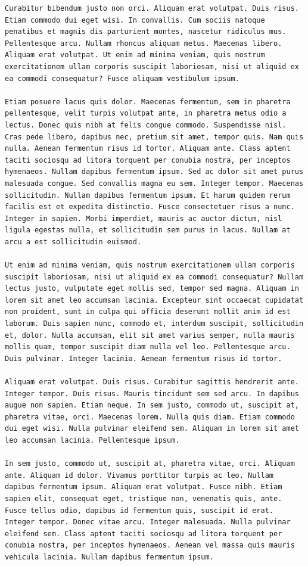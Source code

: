 \documentclass[a4paper, 12pt]{article}
\begin{document}
\begin{verbatim}
Curabitur bibendum justo non orci. Aliquam erat volutpat. Duis risus. Etiam commodo dui eget wisi. In convallis. Cum sociis natoque penatibus et magnis dis parturient montes, nascetur ridiculus mus. Pellentesque arcu. Nullam rhoncus aliquam metus. Maecenas libero. Aliquam erat volutpat. Ut enim ad minima veniam, quis nostrum exercitationem ullam corporis suscipit laboriosam, nisi ut aliquid ex ea commodi consequatur? Fusce aliquam vestibulum ipsum.

Etiam posuere lacus quis dolor. Maecenas fermentum, sem in pharetra pellentesque, velit turpis volutpat ante, in pharetra metus odio a lectus. Donec quis nibh at felis congue commodo. Suspendisse nisl. Cras pede libero, dapibus nec, pretium sit amet, tempor quis. Nam quis nulla. Aenean fermentum risus id tortor. Aliquam ante. Class aptent taciti sociosqu ad litora torquent per conubia nostra, per inceptos hymenaeos. Nullam dapibus fermentum ipsum. Sed ac dolor sit amet purus malesuada congue. Sed convallis magna eu sem. Integer tempor. Maecenas sollicitudin. Nullam dapibus fermentum ipsum. Et harum quidem rerum facilis est et expedita distinctio. Fusce consectetuer risus a nunc. Integer in sapien. Morbi imperdiet, mauris ac auctor dictum, nisl ligula egestas nulla, et sollicitudin sem purus in lacus. Nullam at arcu a est sollicitudin euismod.

Ut enim ad minima veniam, quis nostrum exercitationem ullam corporis suscipit laboriosam, nisi ut aliquid ex ea commodi consequatur? Nullam lectus justo, vulputate eget mollis sed, tempor sed magna. Aliquam in lorem sit amet leo accumsan lacinia. Excepteur sint occaecat cupidatat non proident, sunt in culpa qui officia deserunt mollit anim id est laborum. Duis sapien nunc, commodo et, interdum suscipit, sollicitudin et, dolor. Nulla accumsan, elit sit amet varius semper, nulla mauris mollis quam, tempor suscipit diam nulla vel leo. Pellentesque arcu. Duis pulvinar. Integer lacinia. Aenean fermentum risus id tortor.

Aliquam erat volutpat. Duis risus. Curabitur sagittis hendrerit ante. Integer tempor. Duis risus. Mauris tincidunt sem sed arcu. In dapibus augue non sapien. Etiam neque. In sem justo, commodo ut, suscipit at, pharetra vitae, orci. Maecenas lorem. Nulla quis diam. Etiam commodo dui eget wisi. Nulla pulvinar eleifend sem. Aliquam in lorem sit amet leo accumsan lacinia. Pellentesque ipsum.

In sem justo, commodo ut, suscipit at, pharetra vitae, orci. Aliquam ante. Aliquam id dolor. Vivamus porttitor turpis ac leo. Nullam dapibus fermentum ipsum. Aliquam erat volutpat. Fusce nibh. Etiam sapien elit, consequat eget, tristique non, venenatis quis, ante. Fusce tellus odio, dapibus id fermentum quis, suscipit id erat. Integer tempor. Donec vitae arcu. Integer malesuada. Nulla pulvinar eleifend sem. Class aptent taciti sociosqu ad litora torquent per conubia nostra, per inceptos hymenaeos. Aenean vel massa quis mauris vehicula lacinia. Nullam dapibus fermentum ipsum.


\end{verbatim}
\end{document}
